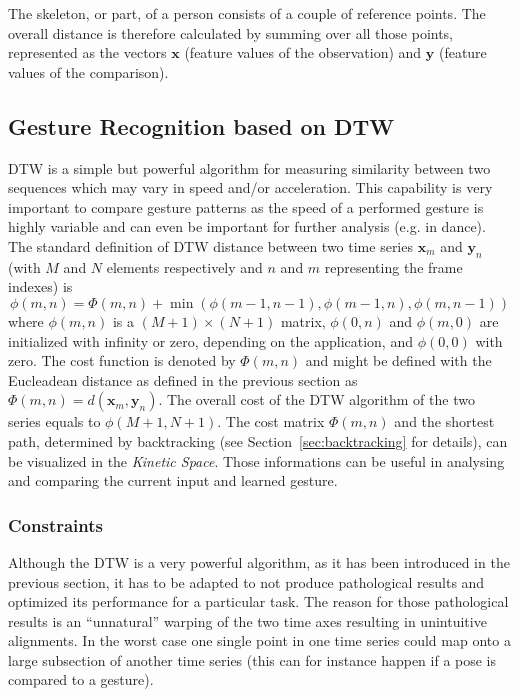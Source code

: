 \documentclass[titlepage,12pt,a4paper]{article}
\begin{document}
The skeleton, or part, of a person consists of a couple of reference points. The overall distance is therefore calculated by summing over all those points, represented as the vectors $\mathbf{x}$ (feature values of the observation) and $\mathbf{y}$ (feature values of the comparison).

\subsection{Gesture Recognition based on DTW}
DTW is a simple but powerful algorithm for measuring similarity between two sequences which may vary in speed and/or acceleration. This capability is very important to compare gesture patterns as the speed of a performed gesture is highly variable and can even be important for further analysis (e.g. in dance). 
The standard definition of DTW distance between two time series $\mathbf{x}_m$ and $\mathbf{y}_n$ (with $M$ and $N$ elements respectively and $n$ and $m$ representing the frame indexes) is
\[
	\phi(m,n) = \Phi(m,n) + \min{(\phi(m-1,n-1),\phi(m-1,n),\phi(m,n-1))}
\]
where $\phi(m,n)$  is a $(M+1) \times (N+1)$ matrix, $\phi(0,n)$  and $\phi(m,0)$ are initialized with infinity or zero, depending on the application, and $\phi(0,0)$ with zero. The cost function is denoted by $\Phi(m,n)$ and might be defined with the Eucleadean distance as defined in the previous section as $\Phi(m,n) = d(\mathbf{x}_m,\mathbf{y}_n)$. The overall cost of the DTW algorithm of the two series equals to $\phi(M+1,N+1)$. The cost matrix $\Phi(m,n)$ and the shortest path, determined by backtracking (see Section~\ref{sec:backtracking} for details), can be visualized in the \emph{Kinetic Space}. Those informations can be useful in analysing and comparing the current input and learned gesture.

\subsubsection{Constraints} 
Although the DTW is a very powerful algorithm, as it has been introduced in the previous section, it has to be adapted to not produce pathological results and optimized its performance for a particular task. The reason for those pathological results is an “unnatural” warping of the two time axes resulting in unintuitive alignments. In the worst case one single point in one time series could map onto a large subsection of another time series (this can for instance happen if a pose is compared to a gesture). 
\end{document}
